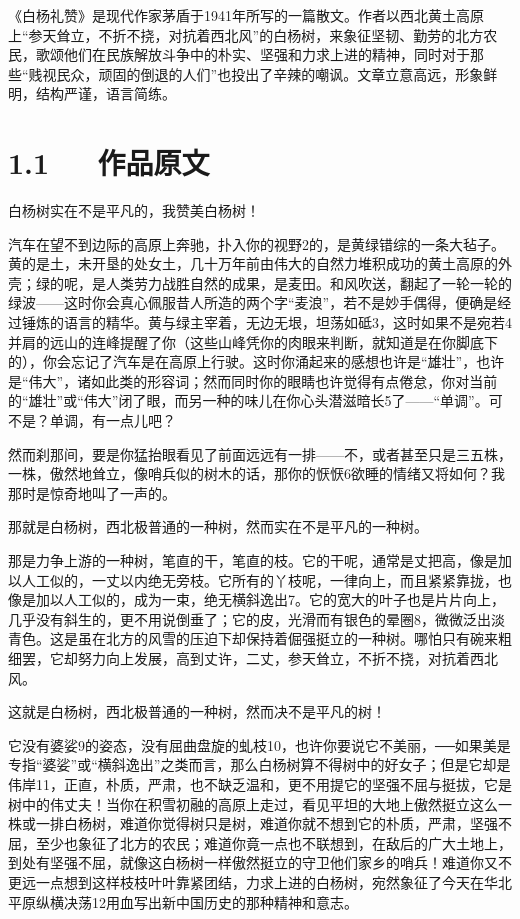 \documentclass[letterpaper,12pt,english]{sphinxmanual}
\begin{document}
《白杨礼赞》是现代作家茅盾于1941年所写的一篇散文。作者以西北黄土高原上“参天耸立，不折不挠，对抗着西北风”的白杨树，来象征坚韧、勤劳的北方农民，歌颂他们在民族解放斗争中的朴实、坚强和力求上进的精神，同时对于那些“贱视民众，顽固的倒退的人们”也投出了辛辣的嘲讽。文章立意高远，形象鲜明，结构严谨，语言简练。


\section{1.1   作品原文}
\label{\detokenize{p01_u6563_u6587/_u8305_u76fe-_u767d_u6768_u793c_u8d5e:id3}}
白杨树实在不是平凡的，我赞美白杨树！

汽车在望不到边际的高原上奔驰，扑入你的视野2的，是黄绿错综的一条大毡子。黄的是土，未开垦的处女土，几十万年前由伟大的自然力堆积成功的黄土高原的外壳；绿的呢，是人类劳力战胜自然的成果，是麦田。和风吹送，翻起了一轮一轮的绿波——这时你会真心佩服昔人所造的两个字“麦浪”，若不是妙手偶得，便确是经过锤炼的语言的精华。黄与绿主宰着，无边无垠，坦荡如砥3，这时如果不是宛若4并肩的远山的连峰提醒了你（这些山峰凭你的肉眼来判断，就知道是在你脚底下的），你会忘记了汽车是在高原上行驶。这时你涌起来的感想也许是“雄壮”，也许是“伟大”，诸如此类的形容词；然而同时你的眼睛也许觉得有点倦怠，你对当前的“雄壮”或“伟大”闭了眼，而另一种的味儿在你心头潜滋暗长5了——“单调”。可不是？单调，有一点儿吧？

然而刹那间，要是你猛抬眼看见了前面远远有一排——不，或者甚至只是三五株，一株，傲然地耸立，像哨兵似的树木的话，那你的恹恹6欲睡的情绪又将如何？我那时是惊奇地叫了一声的。

那就是白杨树，西北极普通的一种树，然而实在不是平凡的一种树。

那是力争上游的一种树，笔直的干，笔直的枝。它的干呢，通常是丈把高，像是加以人工似的，一丈以内绝无旁枝。它所有的丫枝呢，一律向上，而且紧紧靠拢，也像是加以人工似的，成为一束，绝无横斜逸出7。它的宽大的叶子也是片片向上，几乎没有斜生的，更不用说倒垂了；它的皮，光滑而有银色的晕圈8，微微泛出淡青色。这是虽在北方的风雪的压迫下却保持着倔强挺立的一种树。哪怕只有碗来粗细罢，它却努力向上发展，高到丈许，二丈，参天耸立，不折不挠，对抗着西北风。

这就是白杨树，西北极普通的一种树，然而决不是平凡的树！

它没有婆娑9的姿态，没有屈曲盘旋的虬枝10，也许你要说它不美丽，──如果美是专指“婆娑”或“横斜逸出”之类而言，那么白杨树算不得树中的好女子；但是它却是伟岸11，正直，朴质，严肃，也不缺乏温和，更不用提它的坚强不屈与挺拔，它是树中的伟丈夫！当你在积雪初融的高原上走过，看见平坦的大地上傲然挺立这么一株或一排白杨树，难道你觉得树只是树，难道你就不想到它的朴质，严肃，坚强不屈，至少也象征了北方的农民；难道你竟一点也不联想到，在敌后的广大土地上，到处有坚强不屈，就像这白杨树一样傲然挺立的守卫他们家乡的哨兵！难道你又不更远一点想到这样枝枝叶叶靠紧团结，力求上进的白杨树，宛然象征了今天在华北平原纵横决荡12用血写出新中国历史的那种精神和意志。
\end{document}
